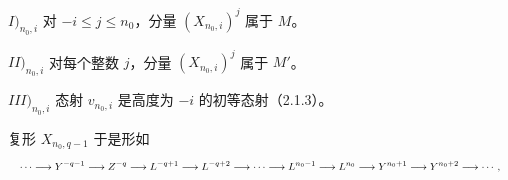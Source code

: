 \noindent $I)_{n_0,i}$ 对 $-i\leq j\leq n_0$，分量
$(X_{n_0,i})^j$ 属于 $M$。

\noindent $II)_{n_0,i}$ 对每个整数 $j$，分量 $(X_{n_0,i})^j$ 属于 $M'$。

\noindent $III)_{n_0,i}$ 态射 $v_{n_0,i}$ 是高度为 $-i$ 的初等态射（2.1.3）。

复形 $X_{n_0,q-1}$ 于是形如
\[
\resizebox{\textwidth}{!}{$\displaystyle
\cdots\longrightarrow Y^{-q-1}\longrightarrow Z^{-q}
\longrightarrow L^{-q+1}\longrightarrow L^{-q+2}\longrightarrow\cdots
\longrightarrow L^{n_0-1}\longrightarrow L^{n_0}
\longrightarrow Y^{n_0+1}\longrightarrow Y^{n_0+2}\longrightarrow\cdots,
$}
\]
\endgroup
